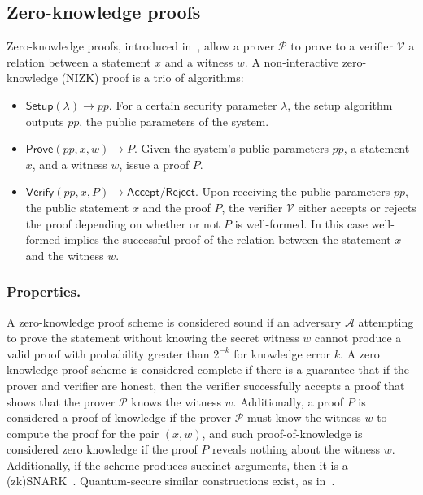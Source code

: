 
\subsection{Zero-knowledge proofs}

Zero-knowledge proofs, introduced in~\cite{zkp}, allow a prover $\mathcal{P}$ to prove to a verifier $\mathcal{V}$ a relation between a statement $x$ and a witness $w$. A non-interactive zero-knowledge (NIZK) proof is a trio of algorithms: 

\begin{itemize}
  \setlength\itemsep{0.35em}

    \item $\mathsf{Setup}(\lambda) \rightarrow pp$. For a certain security parameter $\lambda$, the setup algorithm outputs $pp$, the public parameters of the system. 
    \item $\mathsf{Prove}(pp, x, w) \rightarrow P$. Given the system's public parameters $pp$, a statement $x$, and a witness $w$, issue a proof $P$.
    \item $\mathsf{Verify}(pp, x, P) \rightarrow \mathsf{Accept/Reject}$. Upon receiving the public parameters $pp$, the public statement $x$ and the proof $P$, the verifier $\mathcal{V}$ either accepts or rejects the proof depending on whether or not $P$ is well-formed. In this case well-formed implies the successful proof of the relation between the statement $x$ and the witness $w$. 
\end{itemize}

\subsubsection{Properties.} A zero-knowledge proof scheme is considered sound if an adversary $\mathcal{A}$ attempting to prove the statement without knowing the secret witness $w$ cannot produce a valid proof with probability greater than $2^{-k}$ for knowledge error $k$. A zero knowledge proof scheme is considered complete if there is a guarantee that if the prover and verifier are honest, then the verifier successfully accepts a proof that shows that the prover $\mathcal{P}$ knows the witness $w$. Additionally, a proof $P$ is considered a proof-of-knowledge if the prover $\mathcal{P}$ must know the witness $w$ to compute the proof for the pair $(x, w)$, and such proof-of-knowledge is considered zero knowledge if the proof $P$ reveals nothing about the witness $w$. Additionally, if the scheme produces succinct arguments, then it is a (zk)SNARK~\cite{supersonic,marlin,plonk,groth16,sonic}. Quantum-secure similar constructions exist, as in~\cite{zkstarks,pq_zk}.


